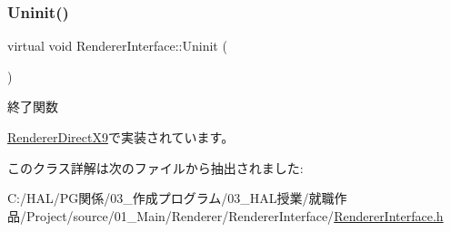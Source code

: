 \subsubsection{\texorpdfstring{Uninit()}{Uninit()}}
{\footnotesize\ttfamily virtual void Renderer\+Interface\+::\+Uninit (\begin{DoxyParamCaption}{ }\end{DoxyParamCaption})\hspace{0.3cm}{\ttfamily [pure virtual]}}



終了関数 



\mbox{\hyperlink{class_renderer_direct_x9_a61c375254fc0a827873fb4c72181f0d5}{Renderer\+Direct\+X9}}で実装されています。



このクラス詳解は次のファイルから抽出されました\+:\begin{DoxyCompactItemize}
\item 
C\+:/\+H\+A\+L/\+P\+G関係/03\+\_\+作成プログラム/03\+\_\+\+H\+A\+L授業/就職作品/\+Project/source/01\+\_\+\+Main/\+Renderer/\+Renderer\+Interface/\mbox{\hyperlink{_renderer_interface_8h}{Renderer\+Interface.\+h}}\end{DoxyCompactItemize}
